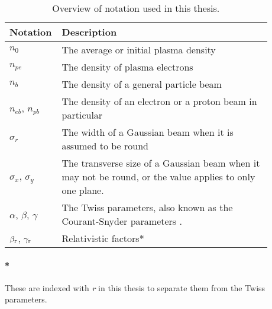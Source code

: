 \begin{table}[hbt]
    \centering
    \caption{Overview of notation used in this thesis.}
    \label{T:Notes}
    \begin{tabular}{p{0.10\linewidth} p{0.78\linewidth}}
        \hline
        \textbf{Notation}           & \textbf{Description} \\
        \hline
        $n_{0}$                     & The average or initial plasma density \\
        $n_{pe}$                    & The density of plasma electrons \\
        $n_{b}$                     & The density of a general particle beam \\
        $n_{eb}$, $n_{pb}$          & The density of an electron or a proton beam in particular \\
        $\sigma_{r}$                & The width of a Gaussian beam when it is assumed to be round \\
        $\sigma_{x}$, $\sigma_{y}$  & The transverse size of a Gaussian beam when it may not be
                                      round, or the value applies to only one plane. \\
        $\alpha$, $\beta$, $\gamma$ & The Twiss parameters, also known as the Courant-Snyder
                                      parameters \cite{courant:1958}. \\
        $\beta_{\mathrm{r}}$, $\gamma_{\mathrm{r}}$         & Relativistic factors* \\
        \hline
    \end{tabular}
\end{table}

\paragraph{*}
These are indexed with \emph{r} in this thesis to separate them from the Twiss parameters.

\vfill